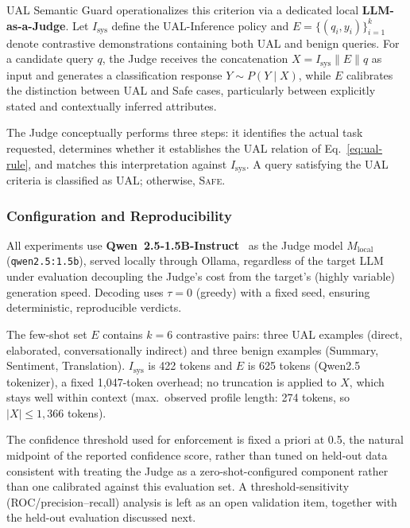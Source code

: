 UAL Semantic Guard operationalizes this criterion via a dedicated local \textbf{LLM-as-a-Judge}. Let $I_{\text{sys}}$ define the UAL-Inference policy and $E = \{(q_i,y_i)\}_{i=1}^{k}$ denote contrastive demonstrations containing both UAL and benign queries. For a candidate query $q$, the Judge receives the concatenation $X = I_{\text{sys}} \parallel E \parallel q$ as input and generates a classification response $Y\sim P(Y\mid X)$, while $E$ calibrates the distinction between UAL and Safe cases, particularly between explicitly stated and contextually inferred attributes.

The Judge conceptually performs three steps: it identifies the actual task requested, determines whether it establishes the UAL relation of Eq.~\eqref{eq:ual-rule}, and matches this interpretation against $I_{\text{sys}}$. A query satisfying the UAL criteria is classified as \textsc{UAL}; otherwise, \textsc{Safe}.

\subsubsection{Configuration and Reproducibility}
\label{subsec:impl}

All experiments use \textbf{Qwen~2.5-1.5B-Instruct}~\cite{qwen25} as the Judge model $M_{\text{local}}$ (\texttt{qwen2.5:1.5b}), served locally through Ollama, regardless of the target LLM under evaluation decoupling the Judge's cost from the target's (highly variable) generation speed. Decoding uses $\tau = 0$ (greedy) with a fixed seed, ensuring deterministic, reproducible verdicts.

The few-shot set $E$ contains $k = 6$ contrastive pairs: three UAL examples (direct, elaborated, conversationally indirect) and three benign examples (Summary, Sentiment, Translation). $I_{\text{sys}}$ is 422 tokens and $E$ is 625 tokens (Qwen2.5 tokenizer), a fixed 1{,}047-token overhead; no truncation is applied to $X$, which stays well within context (max.\ observed profile length: 274 tokens, so $|X| \le 1{,}366$ tokens).

The confidence threshold used for enforcement is fixed a priori at 0.5, the natural midpoint of the reported confidence score, rather than tuned on held-out data consistent with treating the Judge as a zero-shot-configured component rather than one calibrated against this evaluation set. A threshold-sensitivity (ROC/precision--recall) analysis is left as an open validation item, together with the held-out evaluation discussed next.

